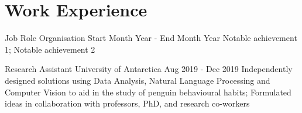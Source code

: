 \section*{Work Experience}

\componentlist
    {Job Role}
    {Organisation}
    {Start Month Year - End Month Year}
    {
        Notable achievement 1;
        Notable achievement 2
    }

\componentlist
    {Research Assistant}
    {University of Antarctica}
    {Aug 2019 - Dec 2019}
    {
        Independently designed solutions using Data Analysis, Natural Language Processing and Computer Vision to aid in the study of penguin behavioural habits;
        Formulated ideas in collaboration with professors, PhD, and research co-workers
    }